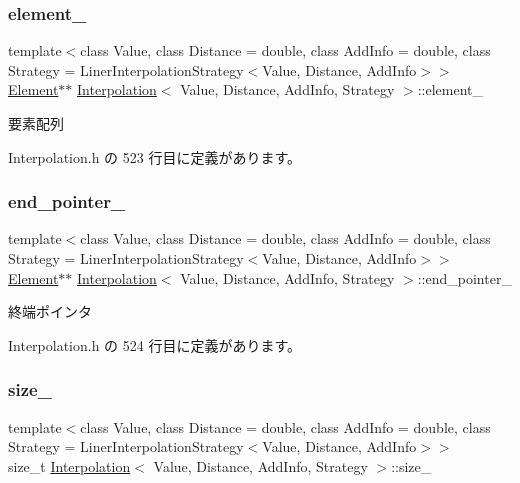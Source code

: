 \subsubsection{\texorpdfstring{element\+\_\+}{element\_}}
{\footnotesize\ttfamily template$<$class Value, class Distance = double, class Add\+Info = double, class Strategy = Liner\+Interpolation\+Strategy$<$\+Value, Distance, Add\+Info$>$$>$ \\
\mbox{\hyperlink{class_interpolation_a01e71544809483d7a2ee72fe0007bcb0}{Element}}$\ast$$\ast$ \mbox{\hyperlink{class_interpolation}{Interpolation}}$<$ Value, Distance, Add\+Info, Strategy $>$\+::element\+\_\+\hspace{0.3cm}{\ttfamily [private]}}



要素配列 



 Interpolation.\+h の 523 行目に定義があります。

\mbox{\label{class_interpolation_a28d232d52cf5aa84d12d073fa400c129}} 
\subsubsection{\texorpdfstring{end\+\_\+pointer\+\_\+}{end\_pointer\_}}
{\footnotesize\ttfamily template$<$class Value, class Distance = double, class Add\+Info = double, class Strategy = Liner\+Interpolation\+Strategy$<$\+Value, Distance, Add\+Info$>$$>$ \\
\mbox{\hyperlink{class_interpolation_a01e71544809483d7a2ee72fe0007bcb0}{Element}}$\ast$$\ast$ \mbox{\hyperlink{class_interpolation}{Interpolation}}$<$ Value, Distance, Add\+Info, Strategy $>$\+::end\+\_\+pointer\+\_\+\hspace{0.3cm}{\ttfamily [private]}}



終端ポインタ 



 Interpolation.\+h の 524 行目に定義があります。

\mbox{\label{class_interpolation_a5652d5fc7f1968b7f11cd5a6b36bfb5a}} 
\subsubsection{\texorpdfstring{size\+\_\+}{size\_}}
{\footnotesize\ttfamily template$<$class Value, class Distance = double, class Add\+Info = double, class Strategy = Liner\+Interpolation\+Strategy$<$\+Value, Distance, Add\+Info$>$$>$ \\
size\+\_\+t \mbox{\hyperlink{class_interpolation}{Interpolation}}$<$ Value, Distance, Add\+Info, Strategy $>$\+::size\+\_\+\hspace{0.3cm}{\ttfamily [private]}}




